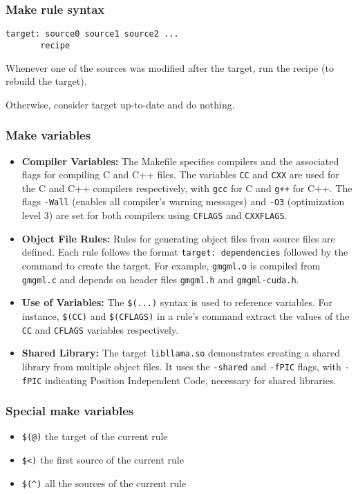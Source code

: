\documentclass[12pt]{article}
\begin{document}
\subsubsection{Make rule syntax}

\begin{verbatim}
target: source0 source1 source2 ...
       recipe
\end{verbatim}

Whenever one of the sources was modified after the target, run the recipe (to rebuild the target).

Otherwise, consider target up-to-date and do nothing.

\subsubsection{Make variables}


\begin{itemize}
    \item \textbf{Compiler Variables:} The Makefile specifies compilers and the associated flags for compiling C and C++ files. The variables \texttt{CC} and \texttt{CXX} are used for the C and C++ compilers respectively, with \texttt{gcc} for C and \texttt{g++} for C++. The flags \texttt{-Wall} (enables all compiler's warning messages) and \texttt{-O3} (optimization level 3) are set for both compilers using \texttt{CFLAGS} and \texttt{CXXFLAGS}.
    \item \textbf{Object File Rules:} Rules for generating object files from source files are defined. Each rule follows the format \texttt{target: dependencies} followed by the command to create the target. For example, \texttt{gmgml.o} is compiled from \texttt{gmgml.c} and depends on header files \texttt{gmgml.h} and \texttt{gmgml-cuda.h}.
    \item \textbf{Use of Variables:} The \texttt{\$(...)} syntax is used to reference variables. For instance, \texttt{\$(CC)} and \texttt{\$(CFLAGS)} in a rule's command extract the values of the \texttt{CC} and \texttt{CFLAGS} variables respectively. 
    \item \textbf{Shared Library:} The target \texttt{libllama.so} demonstrates creating a shared library from multiple object files. It uses the \texttt{-shared} and \texttt{-fPIC} flags, with \texttt{-fPIC} indicating Position Independent Code, necessary for shared libraries.
\end{itemize}



\subsubsection{Special make variables}
\begin{itemize}
    \item \verb|$(@)| the target of the current rule
    \item \verb|$<)| the first source of the current rule
    \item \verb|$(^)| all the sources of the current rule
\end{itemize}
\end{document}

